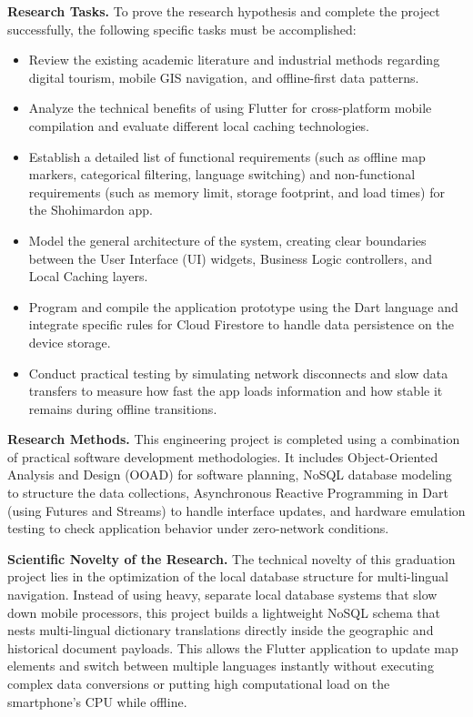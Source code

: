 \documentclass[12pt,a4paper,oneside]{report}
\begin{document}
\noindent\textbf{Research Tasks.} To prove the research hypothesis and complete the
project successfully, the following specific tasks must be accomplished:
\begin{itemize}[leftmargin=1.4em]
  \item Review the existing academic literature and industrial methods regarding
        digital tourism, mobile GIS navigation, and offline-first data patterns.
  \item Analyze the technical benefits of using Flutter for cross-platform mobile
        compilation and evaluate different local caching technologies.
  \item Establish a detailed list of functional requirements (such as offline map
        markers, categorical filtering, language switching) and non-functional
        requirements (such as memory limit, storage footprint, and load times) for the
        Shohimardon app.
  \item Model the general architecture of the system, creating clear boundaries between
        the User Interface (UI) widgets, Business Logic controllers, and Local Caching
        layers.
  \item Program and compile the application prototype using the Dart language and
        integrate specific rules for Cloud Firestore to handle data persistence on the
        device storage.
  \item Conduct practical testing by simulating network disconnects and slow data
        transfers to measure how fast the app loads information and how stable it
        remains during offline transitions.
\end{itemize}

\noindent\textbf{Research Methods.} This engineering project is completed using a
combination of practical software development methodologies. It includes
Object-Oriented Analysis and Design (OOAD) for software planning, NoSQL database
modeling to structure the data collections, Asynchronous Reactive Programming in Dart
(using Futures and Streams) to handle interface updates, and hardware emulation testing
to check application behavior under zero-network conditions.

\noindent\textbf{Scientific Novelty of the Research.} The technical novelty of this
graduation project lies in the optimization of the local database structure for
multi-lingual navigation. Instead of using heavy, separate local database systems that
slow down mobile processors, this project builds a lightweight NoSQL schema that nests
multi-lingual dictionary translations directly inside the geographic and historical
document payloads. This allows the Flutter application to update map elements and switch
between multiple languages instantly without executing complex data conversions or
putting high computational load on the smartphone's CPU while offline.
\end{document}
